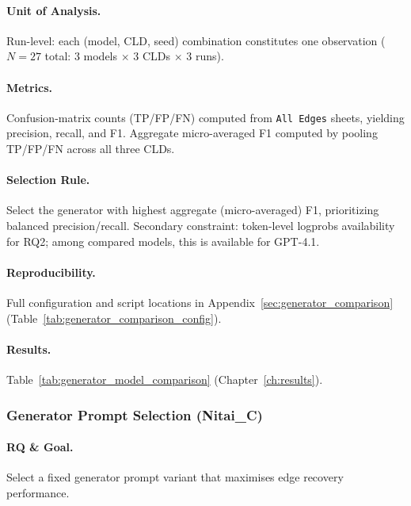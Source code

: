 \paragraph{Unit of Analysis.}
Run-level: each (model, CLD, seed) combination constitutes one observation ($N=27$ total: 3 models $\times$ 3 CLDs $\times$ 3 runs).

\paragraph{Metrics.}
Confusion-matrix counts (TP/FP/FN) computed from \texttt{All Edges} sheets, yielding precision, recall, and F1. Aggregate micro-averaged F1 computed by pooling TP/FP/FN across all three CLDs.

\paragraph{Selection Rule.}
Select the generator with highest aggregate (micro-averaged) F1, prioritizing balanced precision/recall. Secondary constraint: token-level logprobs availability for RQ2; among compared models, this is available for GPT-4.1.

\paragraph{Reproducibility.}
Full configuration and script locations in Appendix~\ref{sec:generator_comparison} (Table~\ref{tab:generator_comparison_config}).

\paragraph{Results.}
Table~\ref{tab:generator_model_comparison} (Chapter~\ref{ch:results}).

\subsubsection{Generator Prompt Selection (Nitai\_C)}
\label{sec:generator_prompt_selection}

\paragraph{RQ \& Goal.}
Select a fixed generator prompt variant that maximises edge recovery performance.

